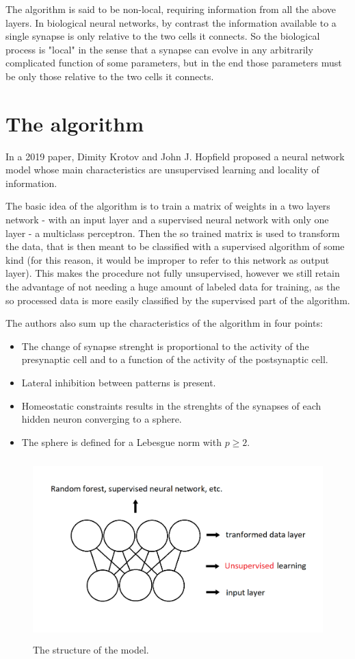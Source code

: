 \documentclass[a4paper]{report}
\begin{document}
The algorithm is said to be non-local, requiring information from all the above layers. In biological neural networks, by contrast the information available to a single synapse is only relative to the two cells it connects. So the biological process is "local" in the sense that a synapse can evolve in any arbitrarily complicated function of some parameters, but in the end those parameters must be only those relative to the two cells it connects.

\section{The algorithm}
In a 2019 paper, Dimity Krotov and John J. Hopfield proposed a neural network model whose main characteristics are unsupervised learning and locality of information.

The basic idea of the algorithm is to train a matrix of weights in a two layers network - with an input layer and a supervised neural network with only one layer - a multiclass perceptron. Then the so trained matrix is used to transform the data, that is then meant to be classified with a supervised algorithm of some kind (for this reason, it would be improper to refer to this network as output layer). This makes the procedure not fully unsupervised, however we still retain the advantage of not needing a huge amount of labeled data for training, as the so processed data is more easily classified by the supervised part of the algorithm.

The authors also sum up the characteristics of the algorithm  in four points:
\begin{itemize}
	\item The change of synapse strenght is proportional to the activity of the presynaptic cell and to a function of the activity of the postsynaptic cell.
	\item Lateral inhibition between patterns is present.
	\item Homeostatic constraints results in the strenghts of the synapses of each hidden neuron converging to a sphere.
	\item The sphere is defined for a Lebesgue norm with $p \geq 2$.
\end{itemize}

\begin{figure} [H]
\centering
\includegraphics [height=7cm ,width=12cm ] {o/2parti2.png}
\caption{The structure of the model.}
\end{figure}
 
\end{document}
